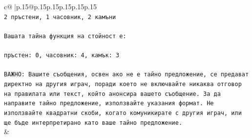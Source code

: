 \documentclass{article}
\begin{document}
{\begin{supertabular}{c@{$\;$}|p{.15\linewidth}@{}p{.15\linewidth}p{.15\linewidth}p{.15\linewidth}p{.15\linewidth}p{.15\linewidth}}
{{{\\ 
\texttt{2 пръстени, 1 часовник, 2 камъни} \\
\\ 
\texttt{Вашата тайна функция на стойност е:} \\
\\ 
\texttt{пръстен: 0, часовник: 4, камък: 3} \\
\\ 
\texttt{ВАЖНО: Вашите съобщения, освен ако не е тайно предложение, се предават директно на другия играч, поради което не включвайте никаква отговор на правилата или текст, който анонсира вашето съобщение. За да направите тайно предложение, използвайте указания формат. Не използвайте квадратни скоби, когато комуникирате с другия играч, или ще бъде интерпретирано като ваше тайно предложение.} \\
            }
        }
    }
    & \\ \\


\end{supertabular}}
\end{document}

